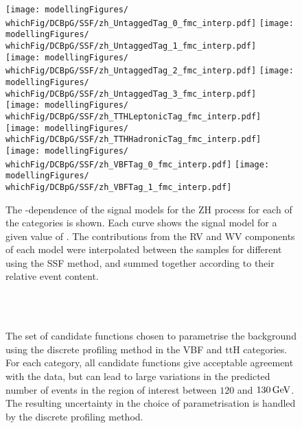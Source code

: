 \begin{figure}[htp!]
\centering
\texttt{[image: modellingFigures/\\whichFig/DCBpG/SSF/zh\_UntaggedTag\_0\_fmc\_interp.pdf]} 
\texttt{[image: modellingFigures/\\whichFig/DCBpG/SSF/zh\_UntaggedTag\_1\_fmc\_interp.pdf]} \\ 
\texttt{[image: modellingFigures/\\whichFig/DCBpG/SSF/zh\_UntaggedTag\_2\_fmc\_interp.pdf]} 
\texttt{[image: modellingFigures/\\whichFig/DCBpG/SSF/zh\_UntaggedTag\_3\_fmc\_interp.pdf]} \\
\texttt{[image: modellingFigures/\\whichFig/DCBpG/SSF/zh\_TTHLeptonicTag\_fmc\_interp.pdf]} 
\texttt{[image: modellingFigures/\\whichFig/DCBpG/SSF/zh\_TTHHadronicTag\_fmc\_interp.pdf]} \\ 
\texttt{[image: modellingFigures/\\whichFig/DCBpG/SSF/zh\_VBFTag\_0\_fmc\_interp.pdf]} 
\texttt{[image: modellingFigures/\\whichFig/DCBpG/SSF/zh\_VBFTag\_1\_fmc\_interp.pdf]} \\
\caption{The \mH-dependence of the signal models for the ZH process for each of the categories is shown. Each curve shows the signal model for a given value of \mH. The contributions from the RV and WV components of each model were interpolated between the samples for different \mH using the SSF method, and summed together according to their relative event content.}

\label{fig:model:sig_interpolation_zh}
\end{figure}

\begin{figure}[p]
 \begin{center}
 \\
 \\
 \caption{The set of candidate functions chosen to parametrise the background using the discrete profiling method in the VBF and ttH categories. For each category, all candidate functions give acceptable agreement with the data, but can lead to large variations in the predicted number of events in the region of interest between $120$ and $130\,\text{Ge\hspace{-.08em}V}$. The resulting uncertainty in the choice of parametrisation is handled by the discrete profiling method.}
 \label{fig:model_bkg_multipdf_bis}
 \end{center}
\end{figure}
\fi

